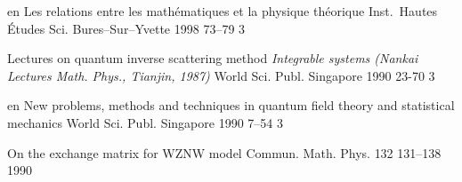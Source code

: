 {en}
{Les relations entre les math\'ematiques
 et la physique th\'eorique}
{Inst.\ Hautes \'Etudes Sci.} {Bures--Sur--Yvette} {1998} {} {73--79} {3}


{\LF}
{Lectures on quantum inverse scattering method}
{\em Integrable systems (Nankai Lectures Math. Phys., Tianjin, 1987)}
{World Sci. Publ.} {Singapore} {1990} {} {23-70} {3}


{en}
{New problems, methods and techniques in quantum field theory and statistical mechanics}
{World Sci. Publ.} {Singapore} {1990} {} {7--54} {3}

{\LF}
{On the exchange matrix for {WZNW} model}
{Commun. Math. Phys.} {132} {} {131--138} {1990}

